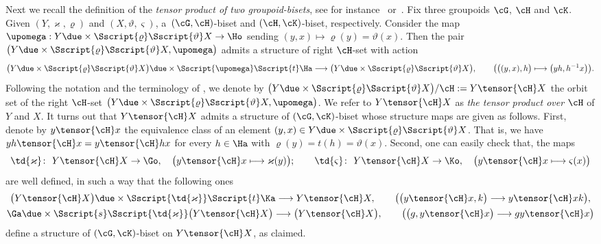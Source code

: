 Next we recall the definition of the \emph{tensor product of two groupoid-bisets}, see for instance~\cite{ElKaoutit:2015, Kaoutit/Spinosa:2018} or~\cite{Kaoutit/Kowalzig:14}. Fix three groupoids $\cG$, $\cH$ and $\cK$. Given $(Y, \varkappa,\varrho)$ and $(X, \vartheta,\varsigma)$, a~$(\cG, \cH)$-biset and $(\cH,\cK)$-biset, respectively. Consider the map $\upomega: Y \due \times {\Sscript{\varrho}}{ \Sscript{\vartheta}} X \to \Ho$ sending $(y,x) \mapsto \varrho(y)=\vartheta(x)$. Then the pair $\big(Y \due \times {\Sscript{\varrho}}{ \Sscript{\vartheta}} X, \upomega \big)$ admits a structure of right $\cH$-set with action
\begin{gather*}
\big(Y \due \times {\Sscript{\varrho}}{ \Sscript{\vartheta}} X\big) \due \times {\Sscript{\upomega}}{ \Sscript{t}} \Ha \longrightarrow \big(Y \due \times {\Sscript{\varrho}}{
\Sscript{\vartheta}} X\big),\qquad \big( \big((y,x), h\big) \longmapsto \big(yh,h^{-1}x\big) \big).
\end{gather*}
Following the notation and the terminology of \cite[Remark 2.12]{ElKaoutit:2015}, we denote by $\big(Y \due \times {\Sscript{\varrho}}{ \Sscript{\vartheta}} X\big) / \cH:= Y \tensor{\cH}X$ the orbit set of the right $\cH$-set $\big(Y \due \times {\Sscript{\varrho}}{ \Sscript{\vartheta}} X, \upomega\big)$. We refer to $Y\tensor{\cH}X$ as \emph{the tensor product over $\cH$} of $Y$ and $X$. It turns out that $Y\tensor{\cH}X$ admits a structure of $(\cG,\cK)$-biset whose structure maps are given as follows. First, denote by $y\tensor{\cH}x$ the equivalence class of an element $(y,x) \in Y \due \times {\Sscript{\varrho}}{ \Sscript{\vartheta}} X$. That is, we have $yh\tensor{\cH}x=y\tensor{\cH}hx$ for every $h \in \Ha$ with $\varrho(y)=t(h)=\vartheta(x)$. Second, one can easily check that, the maps
\begin{gather*}
\td{\varkappa}\colon \ Y \tensor{\cH} X \to \Go, \quad \big( y\tensor{\cH}x \longmapsto \varkappa(y) \big) ;\qquad \td{\varsigma}\colon \ Y \tensor{\cH} X \to \Ko, \quad \big( y\tensor{\cH}x \longmapsto \varsigma(x) \big)
\end{gather*}
are well defined, in such a way that the following ones
\begin{gather*}
\big(Y \tensor{\cH} X\big) \due \times {\Sscript{\td{\varkappa}}}{ \Sscript{t} } \Ka \longrightarrow Y \tensor{\cH} X, \qquad \big( \big( y\tensor{\cH}x, k\big) \longrightarrow y\tensor{\cH}xk \big), \\
\Ga \due \times {\Sscript{s}}{ \Sscript{\td{\varkappa}} } \big(Y \tensor{\cH} X\big) \longrightarrow \big(Y \tensor{\cH}X\big), \qquad \big( \big(g, y\tensor{\cH}x\big) \longrightarrow gy\tensor{\cH}x \big)
\end{gather*}
define a structure of $(\cG,\cK)$-biset on $Y\tensor{\cH}X$, as claimed.

